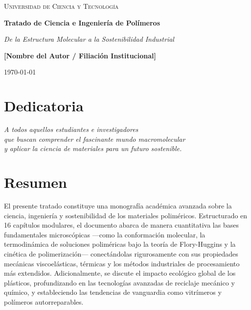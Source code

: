 \documentclass[twoside,11pt,a4paper]{book}
\begin{document}
\frontmatter

\begin{titlepage}
    \centering
    \vspace*{2cm}
    {\scshape\LARGE Universidad de Ciencia y Tecnología \par}
    \vspace{1.5cm}
    {\huge\bfseries Tratado de Ciencia e Ingeniería de Polímeros \par}
    \vspace{0.5cm}
    {\Large\itshape De la Estructura Molecular a la Sostenibilidad Industrial \par}
    \vspace{2cm}
    {\Large\bfseries [Nombre del Autor / Filiación Institucional] \par}
    \vfill
    {\large \today \par}
\end{titlepage}

\chapter*{Dedicatoria}
\thispagestyle{empty}
\begin{flushright}
    \itshape
    A todos aquellos estudiantes e investigadores\\
    que buscan comprender el fascinante mundo macromolecular\\
    y aplicar la ciencia de materiales para un futuro sostenible.
\end{flushright}

\chapter*{Resumen}
El presente tratado constituye una monografía académica avanzada sobre la ciencia, ingeniería y sostenibilidad de los materiales poliméricos. Estructurado en 16 capítulos modulares, el documento abarca de manera cuantitativa las bases fundamentales microscópicas —como la conformación molecular, la termodinámica de soluciones poliméricas bajo la teoría de Flory-Huggins y la cinética de polimerización— conectándolas rigurosamente con sus propiedades mecánicas viscoelásticas, térmicas y los métodos industriales de procesamiento más extendidos. Adicionalmente, se discute el impacto ecológico global de los plásticos, profundizando en las tecnologías avanzadas de reciclaje mecánico y químico, y estableciendo las tendencias de vanguardia como vitrímeros y polímeros autorreparables.
\end{document}
